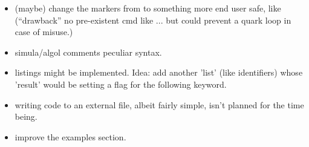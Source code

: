 \begin{itemize}
  \item (maybe) change the markers from  to something more end user safe, like  (``drawback'' no pre-existent cmd like ... but could prevent a quark loop in case of misuse.)
  \item simula/algol comments peculiar syntax.
  \item listings  might be implemented. Idea: add another 'list' (like identifiers) whose 'result' would be setting a flag for the following keyword.
  \item writing code to an external file, albeit fairly simple, isn't planned for the time being.
  \item improve the examples section.
\end{itemize}

